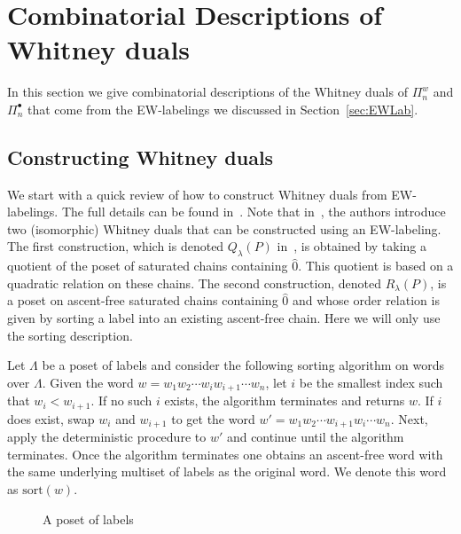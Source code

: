 \documentclass[11pt]{article}
\theoremstyle{definition}
\numberwithin{equation}{section}
\newcommand{\sort}{\mathrm{sort}}
\begin{document}
  
 
\section{Combinatorial Descriptions of  Whitney duals} \label{sec:CombDescriptOfWhitneyDual}


In this section we give combinatorial descriptions of the Whitney duals of $\Pi_n^w$ and $\Pi_n^\bullet$ that come from the EW-labelings we discussed in Section~\ref{sec:EWLab}.

\subsection{Constructing Whitney duals}\label{sec:constructingWD}
  We start with a quick review of how to construct Whitney duals from EW-labelings. The full details can be found in~\cite{GonzalezHallam2021}. Note that in~\cite{GonzalezHallam2021}, the authors introduce two (isomorphic) Whitney duals that can be constructed using an EW-labeling.  The first construction, which is denoted $Q_{\lambda}(P)$ in~\cite{GonzalezHallam2021}, is obtained by taking a quotient of the poset of saturated chains containing $\hat{0}$. This quotient is based on a quadratic relation on these chains. The second construction, denoted $R_{\lambda}(P)$, is a poset on ascent-free saturated chains containing $\hat{0}$ and whose order relation is given by sorting a label into an existing ascent-free chain.  Here  we will   only use the sorting description.

Let $\Lambda$ be a poset of labels and consider the following sorting algorithm on words over $\Lambda$.  Given the word  $w=w_1w_2\cdots w_iw_{i+1}\cdots w_n$, let $i$ be the smallest index such that  $w_i<w_{i+1}$.  If no such $i$ exists, the algorithm terminates and returns $w$.  If $i$ does exist, swap $w_i$ and $w_{i+1}$ to get the word $w'=w_1w_2\cdots w_{i+1}w_i\cdots w_n$.  Next, apply the deterministic procedure to $w'$ and continue until the algorithm terminates. Once the algorithm terminates one obtains an  ascent-free word with the same underlying multiset of labels as the original word. We denote this  word as $\sort(w)$. 

\begin{figure}
  \caption{A poset of labels}\label{fig:posetOfLabels}
\end{figure}
\end{document}

